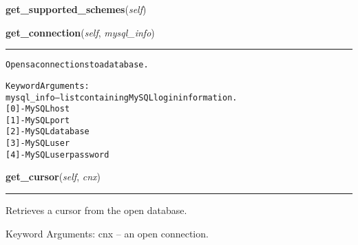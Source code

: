 \hspace{.8\funcindent}\begin{boxedminipage}{\funcwidth}

    \raggedright \textbf{get\_supported\_schemes}(\textit{self})

\setlength{\parskip}{2ex}
\setlength{\parskip}{1ex}
    \end{boxedminipage}

    \label{reliafree:mysql:MySQLInterface:get_connection}

    \vspace{0.5ex}

\hspace{.8\funcindent}\begin{boxedminipage}{\funcwidth}

    \raggedright \textbf{get\_connection}(\textit{self}, \textit{mysql\_info})

    \vspace{-1.5ex}

    \rule{\textwidth}{0.5\fboxrule}
\setlength{\parskip}{2ex}
\begin{alltt}
Opens a connections to a database.

Keyword Arguments:
mysql\_info -- list containing MySQL login information.
              [0] - MySQL host
              [1] - MySQL port
              [2] - MySQL database
              [3] - MySQL user
              [4] - MySQL user password
\end{alltt}

\setlength{\parskip}{1ex}
    \end{boxedminipage}

    \label{reliafree:mysql:MySQLInterface:get_cursor}

    \vspace{0.5ex}

\hspace{.8\funcindent}\begin{boxedminipage}{\funcwidth}

    \raggedright \textbf{get\_cursor}(\textit{self}, \textit{cnx})

    \vspace{-1.5ex}

    \rule{\textwidth}{0.5\fboxrule}
\setlength{\parskip}{2ex}
    Retrieves a cursor from the open database.

    Keyword Arguments: cnx -- an open connection.

\setlength{\parskip}{1ex}
    \end{boxedminipage}

